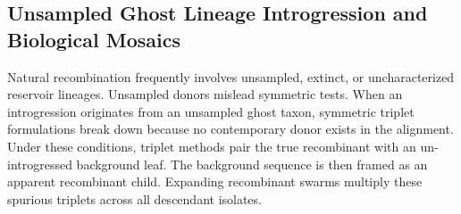 \subsection{Unsampled Ghost Lineage Introgression and Biological Mosaics}
\label{subsec:ghost_introgression}

Natural recombination frequently involves unsampled, extinct, or uncharacterized reservoir lineages.
Unsampled donors mislead symmetric tests.
When an introgression originates from an unsampled ghost taxon, symmetric triplet formulations break down because no contemporary donor exists in the alignment.
Under these conditions, triplet methods pair the true recombinant with an un-introgressed background leaf.
The background sequence is then framed as an apparent recombinant child.
Expanding recombinant swarms multiply these spurious triplets across all descendant isolates.

